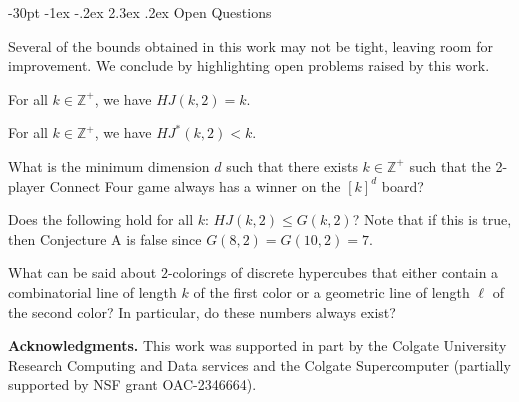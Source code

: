 \documentclass[11pt]{article}
\makeatletter
\theoremstyle{definition}
\renewcommand\section{\@startsection {section}{1}{\z@}%
{-30pt \@plus -1ex \@minus -.2ex}%
{2.3ex \@plus.2ex}%
{\normalfont\normalsize\bfseries}}
\makeatother
\begin{document}
\section{Open Questions}

Several of the bounds obtained in this work may not be tight, leaving room
for improvement. We conclude by highlighting  open problems raised by this work.

For all $k \in \mathbb{Z}^+$, we have $HJ(k,2)=k$.



For all $k \in \mathbb{Z}^+$, we have $HJ^*(k,2) < k$.
 
{
  What is the minimum dimension $d$ such that
 there exists $k \in \mathbb{Z}^+$ such that
the 2-player Connect Four game always has a winner on the $[k]^d$ board? 
 }

 {
Does the following hold for all $k$: $HJ(k,2) \leq G(k,2)$?
Note that if this is true, then Conjecture A is false since
$G(8,2)=G(10,2)=7$.
 }
 
 {
 What can be said about $2$-colorings of discrete hypercubes that either contain
 a combinatorial line of length $k$ of the first color or a geometric line of
 length $\ell$ of the second color?  In particular, do these numbers always exist?
 }


\vskip 20pt
\noindent
\textbf{Acknowledgments.} This work was supported in part by the Colgate University Research Computing and Data services and the Colgate Supercomputer (partially supported by NSF grant OAC-2346664).
\end{document}

